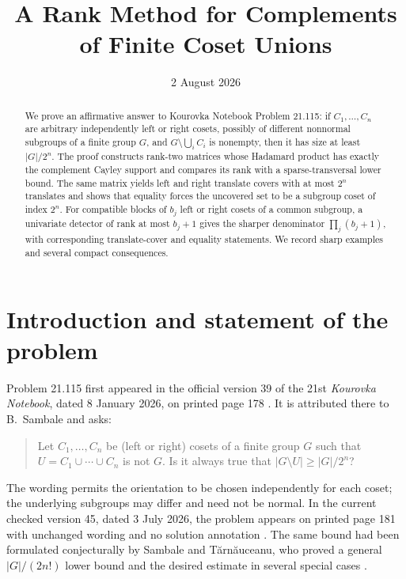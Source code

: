 \documentclass[11pt,a4paper]{amsart}
\title{A Rank Method for Complements of Finite Coset Unions}
\date{2 August 2026}
\theoremstyle{definition}
\theoremstyle{remark}
\begin{document}
\begin{abstract}
We prove an affirmative answer to Kourovka Notebook Problem 21.115: if
$C_1,\ldots,C_n$ are arbitrary independently left or right cosets, possibly of
different nonnormal subgroups of a finite group $G$, and
$G\setminus\bigcup_i C_i$ is nonempty, then it has size at least $|G|/2^n$.
The proof constructs rank-two matrices whose Hadamard product has exactly the
complement Cayley support and compares its rank with a sparse-transversal lower
bound.  The same matrix yields left and right translate covers with at most
$2^n$ translates and shows that equality forces the uncovered set to be a
subgroup coset of index $2^n$.  For compatible blocks of $b_j$ left or right
cosets of a common subgroup, a univariate detector of rank at most $b_j+1$
gives the sharper denominator $\prod_j(b_j+1)$, with corresponding
translate-cover and equality statements.  We record sharp examples and several
compact consequences.
\end{abstract}
\maketitle

\section{Introduction and statement of the problem}

Problem 21.115 first appeared in the official version 39 of the 21st
\emph{Kourovka Notebook}, dated 8 January 2026, on printed page 178
\cite[p.~178]{Kourovka21v39}.  It is attributed there to B.~Sambale and asks:

\begin{quote}
Let $C_1,\ldots,C_n$ be (left or right) cosets of a finite group $G$ such that
$U=C_1\cup\cdots\cup C_n$ is not $G$.  Is it always true that
$|G\setminus U|\ge |G|/2^n$?
\end{quote}

The wording permits the orientation to be chosen independently for each coset;
the underlying subgroups may differ and need not be normal.  In the current
checked version 45, dated 3 July 2026, the problem appears on printed page 181
with unchanged wording and no solution annotation \cite[p.~181]{Kourovka21v45}.
The same bound had been formulated conjecturally by Sambale and
T\u{a}rn\u{a}uceanu, who proved a general $|G|/(2n!)$ lower bound and the desired
estimate in several special cases \cite{SambaleTarnauceanu2022}.
\end{document}
